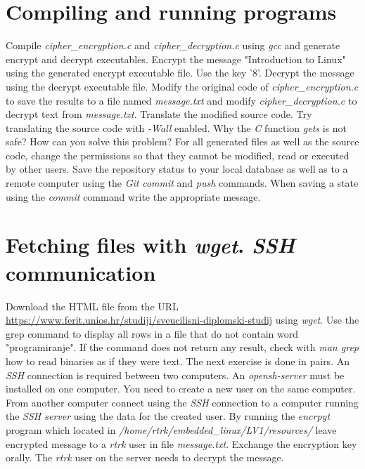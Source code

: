 \documentclass[11pt]{article}
\begin{document}
\section{Compiling and running programs}
Compile \textit{cipher\_encryption.c} and \textit{cipher\_decryption.c} using
 \textit{gcc} and generate encrypt and decrypt executables. Encrypt the message
 "Introduction to Linux" using the generated encrypt executable file. Use the
 key '8'. Decrypt the message using the decrypt executable file. Modify the
 original code of \textit{cipher\_encryption.c} to save the results to a file
 named \textit{message.txt} and modify \textit{cipher\_decryption.c} to
 decrypt text from \textit{message.txt}. Translate the modified source code.
\newline
\newline
Try translating the source code with \textit{-Wall} enabled. Why the \textit{C}
 function \textit{gets} is not safe? How can you solve this problem?
\newline
\newline
 For all generated files as well as the source code, change the permissions so
that they cannot be modified, read or executed by other users.
\newline
\newline
Save the repository status to your local database as well as to a remote
 computer using the \textit{Git} \textit{commit} and \textit{push} commands.
 When saving a state using the \textit{commit} command write the appropriate
 message.
\section{Fetching files with \textit{wget}. \textit{SSH} communication}
Download the HTML file from the URL
 \url{https://www.ferit.unios.hr/studiji/sveucilisni-diplomski-studij} using
 \textit{wget}. Use the grep command to display all rows in a file that
 do not contain word "programiranje". If the command does not return any
 result, check with \textit{man grep} how to read binaries as if they were
 text.
\newline
\newline
The next exercise is done in pairs. An \textit{SSH} connection is required
 between two computers. An \textit{opensh-server} must be installed on one
 computer. You need to create a new user on the same computer. From another
 computer connect using the \textit{SSH} connection to a computer running the
\textit{SSH server} using the data for the created user. By running the
\textit{encrpyt} program which located in
\textit{/home/rtrk/embedded\_linux/LV1/resources/} leave encrypted message
 to a \textit{rtrk} user in file \textit{message.txt}. Exchange the encryption
key orally. The \textit{rtrk} user on the server needs to decrypt the message.
\end{document}
